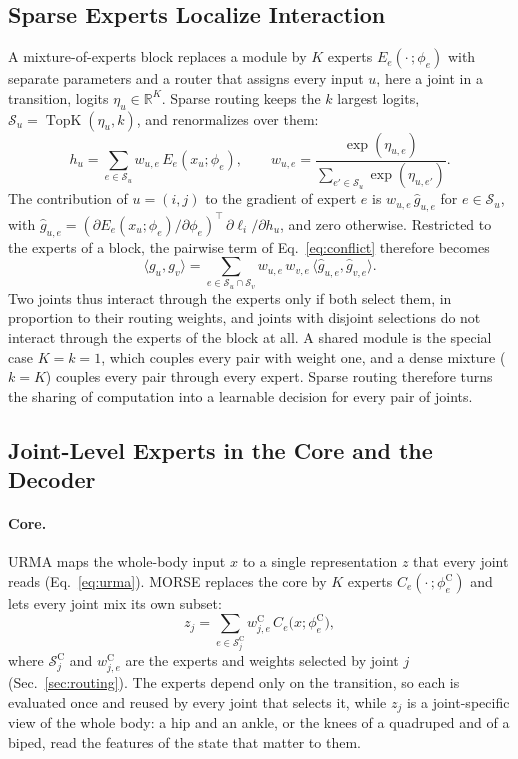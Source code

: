 \subsection{Sparse Experts Localize Interaction}
\label{sec:locality}

A mixture-of-experts block replaces a module by $K$ experts $E_e(\cdot\,;\phi_e)$ with separate parameters and a router
that assigns every input $u$, here a joint in a transition, logits $\eta_u\in\mathbb{R}^{K}$. Sparse routing keeps the
$k$ largest logits, $\mathcal{S}_u=\operatorname{TopK}(\eta_u,k)$, and renormalizes over them:
\begin{equation}
h_u=\sum_{e\in\mathcal{S}_u}w_{u,e}\,E_e(x_u;\phi_e),\qquad
w_{u,e}=\frac{\exp(\eta_{u,e})}{\sum_{e'\in\mathcal{S}_u}\exp(\eta_{u,e'})}.
\label{eq:sparse_moe}
\end{equation}
The contribution of $u=(i,j)$ to the gradient of expert $e$ is $w_{u,e}\,\hat g_{u,e}$ for $e\in\mathcal{S}_u$, with
$\hat g_{u,e}=(\partial E_e(x_u;\phi_e)/\partial\phi_e)^{\top}\,\partial\ell_i/\partial h_u$, and zero otherwise.
Restricted to the experts of a block, the pairwise term of Eq.~\eqref{eq:conflict} therefore becomes
\begin{equation}
\bigl\langle g_u,g_v\bigr\rangle=\sum_{e\in\mathcal{S}_u\cap\mathcal{S}_v}w_{u,e}\,w_{v,e}\,
\bigl\langle\hat g_{u,e},\hat g_{v,e}\bigr\rangle .
\label{eq:localized}
\end{equation}
Two joints thus interact through the experts only if both select them, in proportion to their routing weights, and
joints with disjoint selections do not interact through the experts of the block at all. A shared module is the special
case $K=k=1$, which couples every pair with weight one, and a dense mixture ($k=K$) couples every pair through every
expert. Sparse routing therefore turns the sharing of computation into a learnable decision for every pair of joints.

\subsection{Joint-Level Experts in the Core and the Decoder}
\label{sec:experts}

\paragraph{Core.}
URMA maps the whole-body input $x$ to a single representation $z$ that every joint reads (Eq.~\eqref{eq:urma}). MORSE
replaces the core by $K$ experts $C_e(\cdot\,;\phi^{\mathrm{C}}_e)$ and lets every joint mix its own subset:
\begin{equation}
z_j=\sum_{e\in\mathcal{S}^{\mathrm{C}}_j}w^{\mathrm{C}}_{j,e}\,C_e\bigl(x;\phi^{\mathrm{C}}_e\bigr),
\label{eq:core}
\end{equation}
where $\mathcal{S}^{\mathrm{C}}_j$ and $w^{\mathrm{C}}_{j,e}$ are the experts and weights selected by joint $j$
(Sec.~\ref{sec:routing}). The experts depend only on the transition, so each is evaluated once and reused by every
joint that selects it, while $z_j$ is a joint-specific view of the whole body: a hip and an ankle, or the knees of a
quadruped and of a biped, read the features of the state that matter to them.


